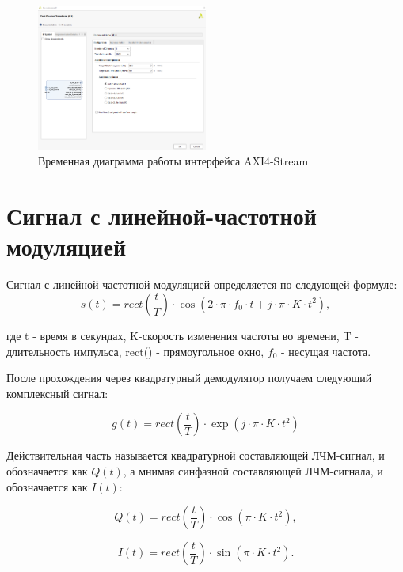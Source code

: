 \begin{figure}[h]
	\centering
	\includegraphics[width=0.5\textwidth]{image/fft_config.png}
	\caption{Временная диаграмма работы интерфейса AXI4-Stream}
	\label{fft_detailed_implem}
\end{figure}
	
\section{Сигнал с линейной-частотной модуляцией}

Сигнал с линейной-частотной модуляцией определяется по следующей формуле:
\begin{equation}	
	s(t) = rect(\frac{t}{T}) \cdot \cos(2 \cdot \pi \cdot f_0 \cdot t + j \cdot \pi \cdot K \cdot t^{2}),
\end{equation}

где t - время в секундах, K-скорость изменения частоты во времени, T - длительность импульса, rect() - прямоугольное окно, \(f_0\) - несущая частота.

После прохождения через квадратурный демодулятор получаем следующий комплексный сигнал:

\begin{equation}	
	g(t) = rect(\frac{t}{T}) \cdot \exp(j \cdot \pi \cdot K \cdot t^{2})
\end{equation}

Действительная часть называется квадратурной
составляющей ЛЧМ-сигнал, и обозначается как \(Q(t)\), а мнимая 
синфазной составляющей ЛЧМ-сигнала, и обозначается как \(I(t)\):

\begin{equation}	
	Q(t) = rect(\frac{t}{T}) \cdot \cos(\pi \cdot K \cdot t^{2}),
\end{equation}

\begin{equation}	
	I(t) = rect(\frac{t}{T}) \cdot \sin(\pi \cdot K \cdot t^{2}).
\end{equation}

